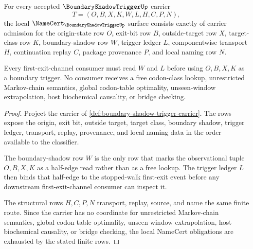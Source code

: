 \begin{theorem}
\label{thm:boundary-shadow-trigger-namecert-obligations}
For every accepted $\BoundaryShadowTriggerUp$ carrier
$$
T=(O,B,X,K,W,L,H,C,P,N),
$$
the local $\NameCert_{\BoundaryShadowTriggerUp}$ surface consists exactly of carrier admission for the origin-state row $O$, exit-bit row $B$, outside-target row $X$, target-class row $K$, boundary-shadow row $W$, trigger ledger $L$, componentwise transport $H$, continuation replay $C$, package provenance $P$, and local naming row $N$.

Every first-exit-channel consumer must read $W$ and $L$ before using $O,B,X,K$ as a boundary trigger. No consumer receives a free codon-class lookup, unrestricted Markov-chain semantics, global codon-table optimality, unseen-window extrapolation, host biochemical causality, or bridge checking.
\end{theorem}
\begin{proof}
Project the carrier of \autoref{def:boundary-shadow-trigger-carrier}. The rows expose the origin, exit bit, outside target, target class, boundary shadow, trigger ledger, transport, replay, provenance, and local naming data in the order available to the classifier.

The boundary-shadow row $W$ is the only row that marks the observational tuple $O,B,X,K$ as a half-edge read rather than as a free lookup. The trigger ledger $L$ then binds that half-edge to the stopped-walk first-exit event before any downstream first-exit-channel consumer can inspect it.

The structural rows $H,C,P,N$ transport, replay, source, and name the same finite route. Since the carrier has no coordinate for unrestricted Markov-chain semantics, global codon-table optimality, unseen-window extrapolation, host biochemical causality, or bridge checking, the local NameCert obligations are exhausted by the stated finite rows.
\end{proof}


\begin{closurestatus}{\BoundaryShadowTriggerUp}
  \theoryclosure{\seedClosure}
  \formalstatus{\unformalizedV}
\end{closurestatus}
